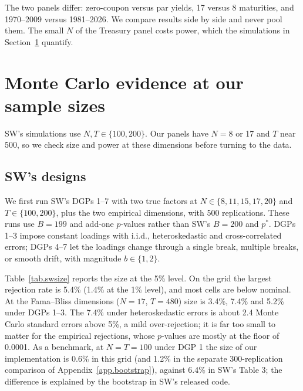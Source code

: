 \documentclass[11pt]{article}
\begin{document}
The two panels differ: zero-coupon versus par yields, 17 versus 8 maturities, and 1970--2009 versus 1981--2026. We compare results side by side and never pool them. The small $N$ of the Treasury panel costs power, which the simulations in Section~\ref{sec.mc} quantify. 

\section{Monte Carlo evidence at our sample sizes}\label{sec.mc}

SW's simulations use $N,T\in\{100,200\}$. Our panels have $N=8$ or 17 and $T$ near 500, so we check size and power at these dimensions before turning to the data.

\subsection{SW's designs}

We first run SW's DGPs 1--7 \citep[Section 5.3]{SuWang2017} with two true factors at $N\in\{8,11,15,17,20\}$ and $T\in\{100,200\}$, plus the two empirical dimensions, with 500 replications. These runs use $B=199$ and add-one $p$-values rather than SW's $B=200$ and $p^*$. DGPs 1--3 impose constant loadings with i.i.d., heteroskedastic and cross-correlated errors; DGPs 4--7 let the loadings change through a single break, multiple breaks, or smooth drift, with magnitude $b\in\{1,2\}$.

Table~\ref{tab.swsize} reports the size at the 5\% level. On the grid the largest rejection rate is 5.4\% (1.4\% at the 1\% level), and most cells are below nominal. At the Fama--Bliss dimensions ($N=17$, $T=480$) size is 3.4\%, 7.4\% and 5.2\% under DGPs 1--3. The 7.4\% under heteroskedastic errors is about 2.4 Monte Carlo standard errors above 5\%, a mild over-rejection; it is far too small to matter for the empirical rejections, whose $p$-values are mostly at the floor of 0.0001. As a benchmark, at $N=T=100$ under DGP 1 the size of our implementation is 0.6\% in this grid (and 1.2\% in the separate 300-replication comparison of Appendix~\ref{app.bootstrap}), against 6.4\% in SW's Table 3; the difference is explained by the bootstrap in SW's released code.
\end{document}
